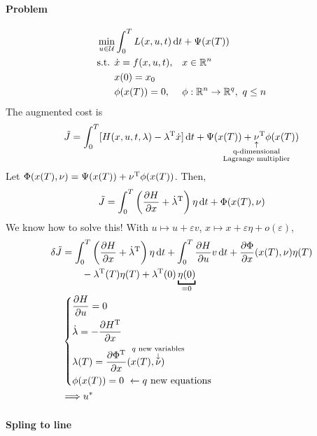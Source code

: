 \paragraph{Problem}
\begin{align}
  & \min_{u\in\mathcal U} \int_0^T L(x,u,t)\mathop{}\!\mathrm{d} t + \Psi(x(T)) \\
  & \text{s.t. } \begin{aligned}[t]
    & \dot x = f(x,u,t), && x\in\mathbb{R}^n \\
    & x(0) = x_0 \\
    & \phi(x(T)) = 0, && \phi:\mathbb{R}^n\to\mathbb{R}^q,\ q\le n
  \end{aligned}
\end{align}
The augmented cost is
\[
  \tilde J = \int_0^T [ H(x,u,t,\lambda) - \lambda\trans \dot x]\dif t + \Psi(x(T)) + \underset{\mathclap{\substack{\uparrow\\ \text{q-dimensional}\\ \text{Lagrange multiplier}}}}{\nu}\trans \phi(x(T))
\]
Let $\Phi(x(T),\nu)=\Psi(x(T)) + \nu^\text{T}\phi(x(T))$. Then,
\[
  \tilde J = \int_0^T \left( \frac{\partial H}{\partial x} + \dot\lambda^\text{T} \right) \eta \mathop{}\!\mathrm{d} t + \Phi(x(T),\nu)
\]
We know how to solve this! With $u\mapsto u+\varepsilon v$, $x\mapsto x+\varepsilon\eta + o(\varepsilon)$,
\begin{align}
  \delta \tilde J &= \int_0^T \left(\pder{H}{x} + \dot\lambda\trans\right)\eta\dif t + \int_0^T \pder{H}{u}v \dif t + \pder{\Phi}{x}(x(T),\nu)\eta(T) \\
                  & \qquad - \lambda\trans(T)\eta(T) + \lambda\trans(0)\underbracket{\eta(0)}_{=0} \\
                  & \begin{dcases}
                    \pder{H}{u} = 0 \\
                    \dot\lambda = -\pder{H\trans}{x} \\
                    \lambda(T) = \pder{\Phi\trans}{x}( x(T), \overset{\mathclap{\substack{q \text{ new variables}\\ \downarrow}}}{\nu} ) \\
                    \phi(x(T)) = 0 \ \leftarrow q \text{ new equations}
                  \end{dcases} \\
                  & \Longrightarrow u^*
\end{align}

\paragraph{Spling to line}

